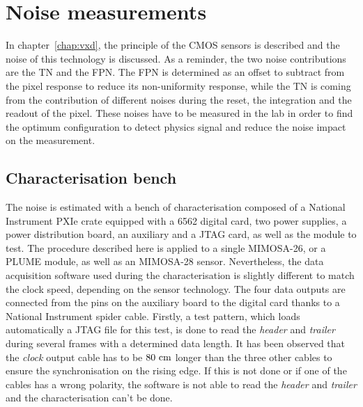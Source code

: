 \section{Noise measurements}
\label{sec:noiseMeasurements}

  In chapter~\ref{chap:vxd}, the principle of the \gls{CMOS} sensors is described and the noise of this technology is discussed.
  As a reminder, the two noise contributions are the \acrfull{TN} and the \acrfull{FPN}.
  The \gls{FPN} is determined as an offset to subtract from the pixel response to reduce its non-uniformity response, while the \gls{TN} is coming from the contribution of different noises during the reset, the integration and the readout of the pixel.
  These noises have to be measured in the lab in order to find the optimum configuration to detect physics signal and reduce the noise impact on the measurement.

  \subsection{Characterisation bench}

  The noise is estimated with a bench of characterisation composed of a National Instrument PXIe crate equipped with a 6562 digital card, two power supplies, a power distribution board, an auxiliary and a JTAG card, as well as the module to test.
  The procedure described here is applied to a single MIMOSA-26, or a PLUME module, as well as an MIMOSA-28 sensor.
  Nevertheless, the data acquisition software used during the characterisation is slightly different to match the clock speed, depending on the sensor technology.
  The four data outputs are connected from the pins on the auxiliary board to the digital card thanks to a National Instrument spider cable.
  Firstly, a test pattern, which loads automatically a \gls{JTAG} file for this test, is done to read the \textit{header} and \textit{trailer} during several frames with a determined data length.
  It has been observed that the \textit{clock} output cable has to be $80~\rm{cm}$ longer than the three other cables to ensure the synchronisation on the rising edge.
  If this is not done or if one of the cables has a wrong polarity, the software is not able to read the \textit{header} and \textit{trailer} and the characterisation can't be done.

